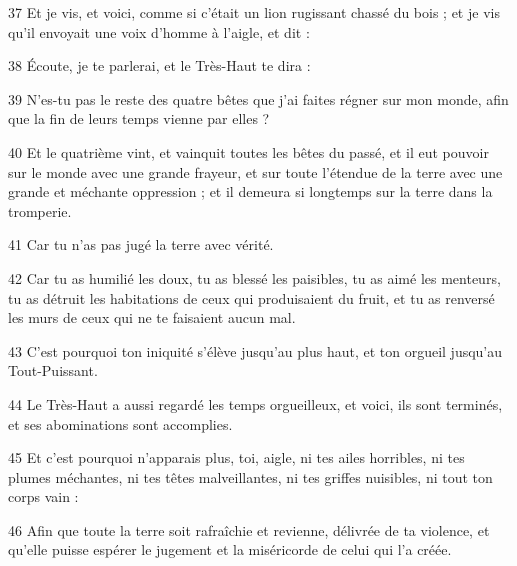 \par 37 Et je vis, et voici, comme si c'était un lion rugissant chassé du bois ; et je vis qu'il envoyait une voix d'homme à l'aigle, et dit :
\par 38 Écoute, je te parlerai, et le Très-Haut te dira :
\par 39 N'es-tu pas le reste des quatre bêtes que j'ai faites régner sur mon monde, afin que la fin de leurs temps vienne par elles ?
\par 40 Et le quatrième vint, et vainquit toutes les bêtes du passé, et il eut pouvoir sur le monde avec une grande frayeur, et sur toute l'étendue de la terre avec une grande et méchante oppression ; et il demeura si longtemps sur la terre dans la tromperie.
\par 41 Car tu n'as pas jugé la terre avec vérité.
\par 42 Car tu as humilié les doux, tu as blessé les paisibles, tu as aimé les menteurs, tu as détruit les habitations de ceux qui produisaient du fruit, et tu as renversé les murs de ceux qui ne te faisaient aucun mal.
\par 43 C'est pourquoi ton iniquité s'élève jusqu'au plus haut, et ton orgueil jusqu'au Tout-Puissant.
\par 44 Le Très-Haut a aussi regardé les temps orgueilleux, et voici, ils sont terminés, et ses abominations sont accomplies.
\par 45 Et c'est pourquoi n'apparais plus, toi, aigle, ni tes ailes horribles, ni tes plumes méchantes, ni tes têtes malveillantes, ni tes griffes nuisibles, ni tout ton corps vain :
\par 46 Afin que toute la terre soit rafraîchie et revienne, délivrée de ta violence, et qu'elle puisse espérer le jugement et la miséricorde de celui qui l'a créée.


